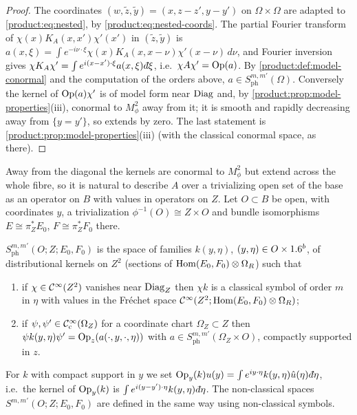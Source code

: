 \begin{proof}
The coordinates $(w,\tilde z,\tilde y)=(x,z-z',y-y')$ on $\Omega\times\Omega$ are
adapted to \eqref{product:eq:nested}, by \eqref{product:eq:nested-coords}. The
partial Fourier transform of $\chi(x)K_A(x,x')\chi'(x')$ in $(\tilde z,\tilde y)$
is $a(x,\xi)=\int e^{-i\nu\cdot\xi}\chi(x)K_A(x,x-\nu)\chi'(x-\nu)\,d\nu$, and Fourier
inversion gives $\chi K_A\chi'=\int e^{i(x-x')\cdot\xi}a(x,\xi)\,\dbar\xi$, i.e.\
$\chi A\chi'=\operatorname{Op}(a)$. By \cref{product:def:model-conormal} and the computation of
the orders above, $a\in S^{m,m'}_{\mathrm{ph}}(\Omega)$. Conversely the kernel of
$\operatorname{Op}(a)\chi'$ is of model form near $\operatorname{Diag}$ and, by
\cref{product:prop:model-properties}(iii), conormal to $M^2_\phi$ away from it; it
is smooth and rapidly decreasing away from $\{y=y'\}$, so extends by zero. The last
statement is \cref{product:prop:model-properties}(iii) (with the classical
conormal space, as there).
\end{proof}

Away from the diagonal the kernels are conormal to $M^2_\phi$ but extend across
the whole fibre, so it is natural to describe $A$ over a trivializing open set of
the base as an operator on $B$ with values in operators on $Z$. Let $O\subset B$ be
open, with coordinates $y$, a trivialization $\phi^{-1}(O)\cong Z\times O$ and
bundle isomorphisms $E\cong\pi_Z^*E_0$, $F\cong\pi_Z^*F_0$ there.

\begin{definition}\label{product:def:operator-symbols}
$S^{m,m'}_{\mathrm{ph}}(O;Z;E_0,F_0)$ is the space of families $k(y,\eta)$,
$(y,\eta)\in O\times1.6^b$, of distributional kernels on $Z^2$ (sections of
$\operatorname{Hom}(E_0,F_0)\otimes\Omega_R$) such that
\begin{enumerate}[label=\textup{(\alph*)}]
\item if $\chi\in\mathcal{C}^\infty(Z^2)$ vanishes near $\operatorname{Diag}_Z$ then $\chi k$ is a classical
symbol of order $m$ in $\eta$ with values in the Fréchet space
$\mathcal{C}^\infty(Z^2;\operatorname{Hom}(E_0,F_0)\otimes\Omega_R)$;
\item if $\psi,\psi'\in\mathcal{C}^\infty_{\mathrm{c}}(\Omega_Z)$ for a coordinate chart $\Omega_Z\subset Z$
then $\psi k(y,\eta)\psi'=\operatorname{Op}_z(a(\cdot,y,\cdot,\eta))$ with
$a\in S^{m,m'}_{\mathrm{ph}}(\Omega_Z\times O)$, compactly supported in $z$.
\end{enumerate}
For $k$ with compact support in $y$ we set
$\Op_y(k)u(y)=\int e^{iy\cdot\eta}k(y,\eta)\hat u(\eta)\,\dbar\eta$, i.e.\ the kernel
of $\operatorname{Op}_y(k)$ is $\int e^{i(y-y')\cdot\eta}k(y,\eta)\,\dbar\eta$. The non-classical
spaces $S^{m,m'}(O;Z;E_0,F_0)$ are defined in the same way using non-classical
symbols.
\end{definition}


